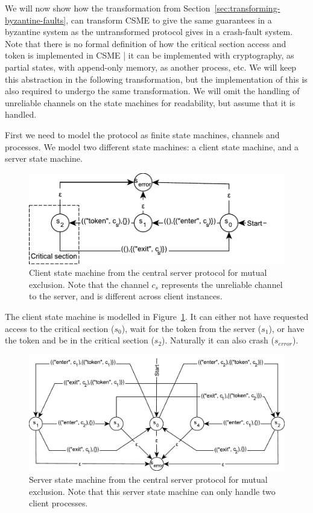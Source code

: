\documentclass{article}
\begin{document}
		We will now show how the transformation from Section~\ref{sec:transforming-byzantine-faults}, can transform CSME to give the same guarantees in a byzantine system as the untransformed protocol gives in a crash-fault system.
		Note that there is no formal definition of how the critical section access and token is implemented in CSME | it can be implemented with cryptography, as partial states, with append-only memory, as another process, etc.
		We will keep this abstraction in the following transformation, but the implementation of this is also required to undergo the same transformation.
		We will omit the handling of unreliable channels on the state machines for readability, but assume that it is handled.

		First we need to model the protocol as finite state machines, channels and processes.
		We model two different state machines: a client state machine, and a server state machine.

		\begin{figure}[ht]
			\center
			\includegraphics[scale=0.6]{figures/state-machines/CSME-client-NFA.pdf}
			\caption{Client state machine from the central server protocol for mutual exclusion. Note that the channel $c_s$ represents the unreliable channel to the server, and is different across client instances.}
			\label{fig:CSME-client-NFA}
		\end{figure}
		\FloatBarrier

		The client state machine is modelled in Figure~\ref{fig:CSME-client-NFA}.
		It can either not have requested access to the critical section ($s_0$), wait for the token from the server ($s_1$), or have the token and be in the critical section ($s_2$).
		Naturally it can also crash ($s_{error}$).

		\begin{figure}[ht]
			\center
			\includegraphics[width=\textwidth]{figures/state-machines/CSME-server-NFA.pdf}
			\caption{Server state machine from the central server protocol for mutual exclusion. Note that this server state machine can only handle two client processes.}
			\label{fig:CSME-server-NFA}
		\end{figure}
		\FloatBarrier
\end{document}
